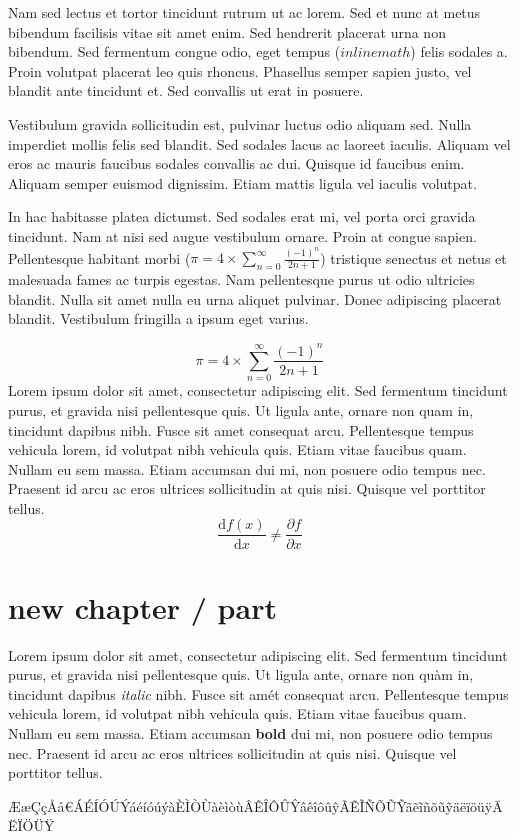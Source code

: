 \documentclass{report}
\begin{document}
Nam sed lectus et tortor tincidunt rutrum ut ac lorem. Sed et nunc at metus bibendum facilisis vitae sit amet enim. Sed hendrerit placerat urna non bibendum. Sed fermentum congue odio, eget tempus ($inline math$) felis sodales a. Proin volutpat placerat leo quis rhoncus. Phasellus semper sapien justo, vel blandit ante tincidunt et. Sed convallis ut erat in posuere.

Vestibulum gravida sollicitudin est, pulvinar luctus odio aliquam sed. Nulla imperdiet mollis felis sed blandit. Sed sodales lacus ac laoreet iaculis. Aliquam vel eros ac mauris faucibus sodales convallis ac dui. Quisque id faucibus enim. Aliquam semper euismod dignissim. Etiam mattis ligula vel iaculis volutpat.

In hac habitasse platea dictumst. Sed sodales erat mi, vel porta orci gravida tincidunt. Nam at nisi sed augue vestibulum ornare. Proin at congue sapien. Pellentesque habitant morbi ($\pi = 4 \times \sum _{n=0} ^{\infty} \frac{(-1)^n}{2n+1}$) tristique senectus et netus et malesuada fames ac turpis egestas. Nam pellentesque purus ut odio ultricies blandit. Nulla sit amet nulla eu urna aliquet pulvinar. Donec adipiscing placerat blandit. Vestibulum fringilla a ipsum eget varius.

$$\pi = 4 \times \sum _{n=0} ^{\infty} \frac{(-1)^n}{2n+1}$$
Lorem ipsum dolor sit amet, consectetur adipiscing elit. Sed fermentum tincidunt purus, et gravida nisi pellentesque quis. Ut ligula ante, ornare non quam in, tincidunt dapibus nibh. Fusce sit amet consequat arcu. Pellentesque tempus vehicula lorem, id volutpat nibh vehicula quis. Etiam vitae faucibus quam. Nullam eu sem massa. Etiam accumsan dui mi, non posuere odio tempus nec. Praesent id arcu ac eros ultrices sollicitudin at quis nisi. Quisque vel porttitor tellus.
$$\frac{\mathrm{d}f(x)}{\mathrm{d} x} \neq \frac{{\partial}f}{{\partial} x}$$

\part{new chapter / part}

Lorem ipsum dolor sit amet, consectetur adipiscing elit. Sed fermentum tincidunt purus, et gravida nisi pellentesque quis. Ut ligula ante, ornare non qu{\`a}m in, tincidunt dapibus \textit{italic} nibh. Fusce sit am{\'e}t consequat arcu. Pellentesque tempus vehicula lorem, id volutpat nibh vehicula quis. Etiam vitae faucibus quam. Nullam eu sem massa. Etiam accumsan \textbf{bold} dui mi, non posuere odio tempus nec. Praesent id arcu ac eros ultrices sollicitudin at quis nisi. Quisque vel porttitor tellus.

{\AE{}}{\ae{}}{\c{C}}{\c{c}}{\r{A}}{\r{a}}{\euro{}}{\'A}{\'E}{\'I}{\'O}{\'U}{\'Y}{\'a}{\'e}{\'i}{\'o}{\'u}{\'y}{\`a}{\`E}{\`I}{\`O}{\`U}{\`a}{\`e}{\`i}{\`o}{\`u}{\^A}{\^E}{\^I}{\^O}{\^U}{\^Y}{\^a}{\^e}{\^i}{\^o}{\^u}{\^y}{\~A}{\~E}{\~I}{\~N}{\~O}{\~U}{\~Y}{\~a}{\~e}{\~i}{\~n}{\~o}{\~u}{\~y}{\"a}{\"e}{\"i}{\"o}{\"u}{\"y}{\"A}{\"E}{\"I}{\"O}{\"U}{\"Y}

    
\end{document}
